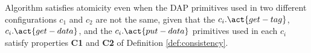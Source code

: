 
\begin{remark}
	Algorithm \ares{} satisfies atomicity even when the DAP primitives used in two 
	different configurations $c_1$ and $c_2$ are not the same, given that the $c_i.\act{get-tag}$,
	$c_i.\act{get-data}$, and the $c_i.\act{put-data}$ primitives 
	used in each $c_i$ satisfy properties \textbf{C1} and \textbf{C2} of Definition \ref{def:consistency}.  
\end{remark}



































